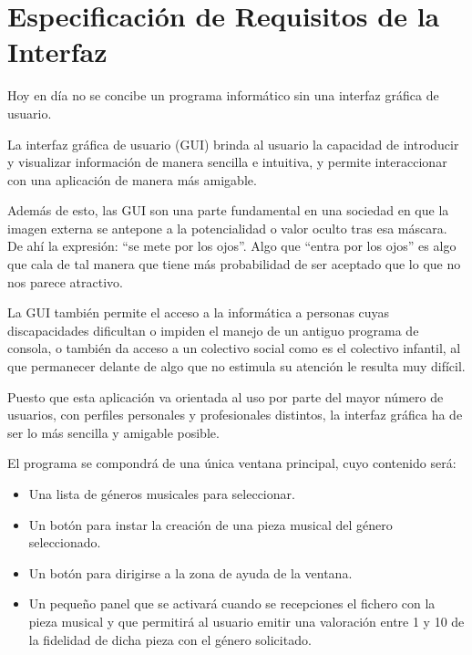 
\chapter{Especificación de Requisitos de la Interfaz}
\label{especificacion-interfaz}
Hoy en día no se concibe un programa informático sin una interfaz gráfica de usuario.

La interfaz gráfica de usuario (GUI) brinda al usuario la capacidad de introducir y visualizar información de manera sencilla e intuitiva, y permite interaccionar con una aplicación de manera más amigable.

Además de esto, las GUI son una parte fundamental en una sociedad en que la imagen externa se antepone a la potencialidad o valor oculto tras esa máscara. De ahí la expresión: ``se mete por los ojos''. Algo que ``entra por los ojos'' es algo que cala de tal manera que tiene más probabilidad de ser aceptado que lo que no nos parece atractivo.

La GUI también permite el acceso a la informática a personas cuyas discapacidades dificultan o impiden el manejo de un antiguo programa de consola, o también da acceso a un colectivo social como es el colectivo infantil, al que permanecer delante de algo que no estimula su atención le resulta muy difícil.

Puesto que esta aplicación va orientada al uso por parte del mayor número de usuarios, con perfiles personales y profesionales distintos, la interfaz gráfica ha de ser lo más sencilla y amigable posible.

El programa se compondrá de una única ventana principal, cuyo contenido será:

\begin{itemize}
    \item Una lista de géneros musicales para seleccionar.
    \item Un botón para instar la creación de una pieza musical del género seleccionado.
    \item Un botón para dirigirse a la zona de ayuda de la ventana.
    \item Un pequeño panel que se activará cuando se recepciones el fichero con la pieza musical y que permitirá al usuario emitir una valoración entre 1 y 10 de la fidelidad de dicha pieza con el género solicitado.
\end{itemize}